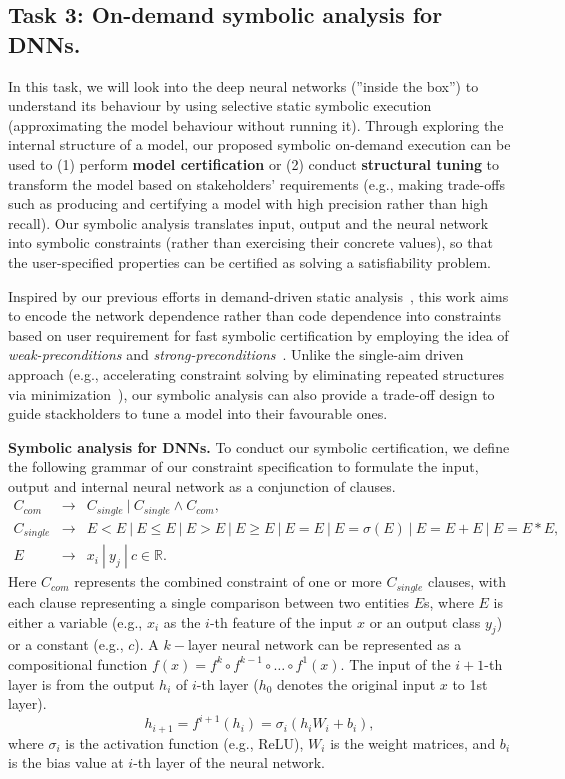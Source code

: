 
\subsection{Task 3: On-demand symbolic analysis for DNNs.}
In this task, we will look into the deep neural networks (''inside the box'') to understand its behaviour by using selective static symbolic execution (approximating the model behaviour without running it). 
Through exploring the internal structure of a model, our proposed symbolic on-demand execution can be used to (1) perform \textbf{model certification} or (2) conduct \textbf{structural tuning} to transform the model based on stakeholders' requirements (e.g., making trade-offs such as producing and certifying a model with high precision rather than high recall). 
Our symbolic analysis translates input, output and the neural network into symbolic constraints (rather than exercising their concrete values), so that the user-specified properties can be certified as solving a satisfiability problem.

Inspired by our previous efforts in demand-driven static analysis~\cite{sui2018value,sui2016svf}, this work aims to encode the network dependence rather than code dependence into constraints based on user requirement for fast symbolic certification by employing the idea of \emph{weak-preconditions} and \emph{strong-preconditions}~\cite{sui2016eliminating}. 
Unlike the single-aim driven approach (e.g., accelerating constraint solving by eliminating repeated structures via minimization~\cite{chen2021faster}), our symbolic analysis can also provide a trade-off design to guide stackholders to tune a model into their favourable ones.

\textbf{Symbolic analysis for DNNs.}
To conduct our symbolic certification, we define the following grammar of our constraint specification to formulate the input, output and internal neural network as a conjunction of clauses. 
\begin{equation}\label{eq:constraints}
\begin{array}{rcl}
    C_{com} & \rightarrow & C_{single}\ |\ C_{single} \wedge C_{com},   \\
    C_{single}&  \rightarrow &E < E\ |\ E \le E\ |\ E > E\ |\ E \ge E\ |\ E = E \ |\ E = \sigma(E) \ |\ E = E + E \ |\ E=E* E, \\
     E & \rightarrow & x_i\ |\ y_j\ |\ c\in\mathbb{R}.
\end{array}
\end{equation}
Here $C_{com}$ represents the combined constraint of one or more $C_{single}$ clauses, with each clause representing a single comparison between two entities $E$s, where $E$ is either a variable (e.g., $x_i$ as the $i$-th feature of the input $x$ or an output class $y_j$) or a constant (e.g., $c$).
A $k-$layer neural network can be represented as a compositional function $f(x) = f^k\circ f^{k-1}\circ \dots \circ f^1(x)$. 
The input of the $i+1$-th layer is from the output $h_i$ of $i$-th layer ($h_0$ denotes the original input $x$ to 1st layer). 
\[ h_{i+1} = f^{i+1}(h_{i}) = \sigma_{i}(h_{i}W_{i} + b_{i}), \]
where $\sigma_i$ is the activation function (e.g., ReLU), $W_i$ is the weight matrices, and $b_i$ is the bias value at $i$-th layer of the neural network.

